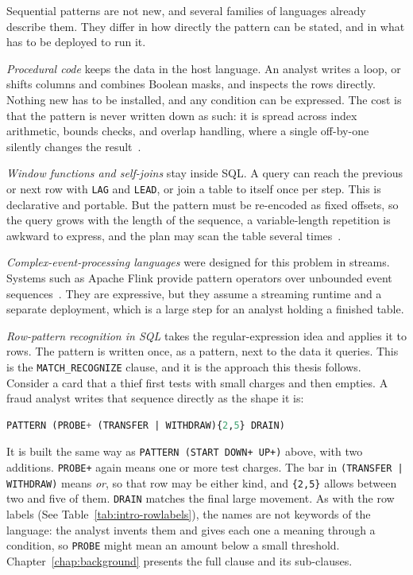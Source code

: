 Sequential patterns are not new, and several families of languages already
describe them.  They differ in how directly the pattern can be stated, and
in what has to be deployed to run it.

\emph{Procedural code} keeps the data in the host language.  An analyst
writes a loop, or shifts columns and combines Boolean masks, and inspects
the rows directly.  Nothing new has to be installed, and any condition can
be expressed.  The cost is that the pattern is never written down as such:
it is spread across index arithmetic, bounds checks, and overlap handling,
where a single off-by-one silently changes the result~\cite{Python_UDF}.

\emph{Window functions and self-joins} stay inside SQL.  A query can reach
the previous or next row with \texttt{LAG} and \texttt{LEAD}, or join a
table to itself once per step.  This is declarative and portable.  But the
pattern must be re-encoded as fixed offsets, so the query grows with the
length of the sequence, a variable-length repetition is awkward to express,
and the plan may scan the table several
times~\cite{cao2012optimizationanalyticwindowfunctions}.

\emph{Complex-event-processing languages} were designed for this problem in
streams.  Systems such as Apache Flink provide pattern operators over
unbounded event sequences~\cite{flink}.  They are expressive, but they
assume a streaming runtime and a separate deployment, which is a large step
for an analyst holding a finished table.

\emph{Row-pattern recognition in SQL} takes the regular-expression idea and
applies it to rows.  The pattern is written once, as a pattern, next to the
data it queries.  This is the \texttt{MATCH\_RECOGNIZE} clause, and it is the
approach this thesis follows.  Consider a card that a thief first tests with
small charges and then empties.  A fraud analyst writes that sequence
directly as the shape it is:

\begin{lstlisting}[language=SQL]
PATTERN (PROBE+ (TRANSFER | WITHDRAW){2,5} DRAIN)
\end{lstlisting}

It is built the same way as \texttt{PATTERN (START DOWN+ UP+)} above, with
two additions.  \texttt{PROBE+} again means one or more test charges.  The
bar in \texttt{(TRANSFER | WITHDRAW)} means \emph{or}, so that row may be
either kind, and \texttt{\{2,5\}} allows between two and five of them.
\texttt{DRAIN} matches the final large movement.  As with the row labels
(See Table~\ref{tab:intro-rowlabels}), the names are not keywords of the
language: the analyst invents them and gives each one a
meaning through a condition, so \texttt{PROBE} might mean an amount below a
small threshold.  Chapter~\ref{chap:background} presents the full
clause and its sub-clauses.

